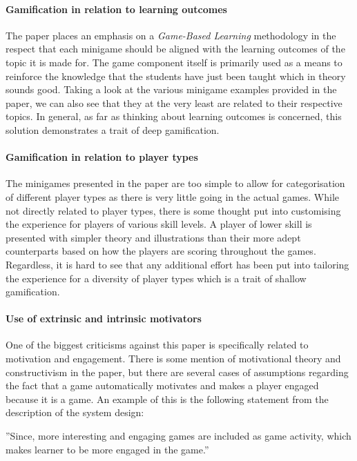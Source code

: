 \paragraph{Gamification in relation to learning outcomes}
The paper places an emphasis on a \emph{Game-Based Learning} methodology in the respect that each minigame should be aligned with the learning outcomes of the topic it is made for. The game component itself is primarily used as a means to reinforce the knowledge that the students have just been taught which in theory sounds good. Taking a look at the various minigame examples provided in the paper, we can also see that they at the very least are related to their respective topics. In general, as far as thinking about learning outcomes is concerned, this solution demonstrates a trait of deep gamification.  

\paragraph{Gamification in relation to player types}
The minigames presented in the paper are too simple to allow for categorisation of different player types as there is very little going in the actual games. While not directly related to player types, there is some thought put into customising the experience for players of various skill levels. A player of lower skill is presented with simpler theory and illustrations than their more adept counterparts based on how the players are scoring throughout the games. Regardless, it is hard to see that any additional effort has been put into tailoring the experience for a diversity of player types which is a trait of shallow gamification. 

\paragraph{Use of extrinsic and intrinsic motivators}
One of the biggest criticisms against this paper is specifically related to motivation and engagement. There is some mention of motivational theory and constructivism in the paper, but there are several cases of assumptions regarding the fact that a game automatically motivates and makes a player engaged because it is a game. An example of this is the following statement from the description of the system design: 
\begin{displayquote}
''Since, more interesting and engaging games are included as game activity, which makes learner to be more engaged in the game.''
\end{displayquote}

